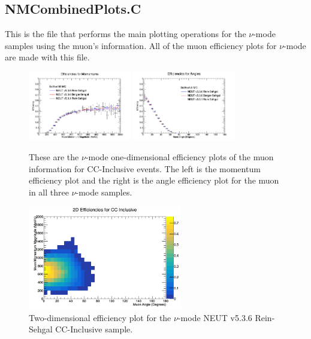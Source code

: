 \documentclass[11pt]{article}
\begin{document}
\subsection{NMCombinedPlots.C}
\label{sub:NMCombinedPlots.C}
This is the file that performs the main plotting operations for the $\nu$-mode samples using the muon's information. All of the muon efficiency plots for $\nu$-mode are made with this file.

\begin{figure}[H]
\centering
\includegraphics[width=0.4\textwidth]{NMCombinedPlotsImages/23-NMCombinedPlots.png}
\includegraphics[width=0.4\textwidth]{NMCombinedPlotsImages/22-NMCombinedPlots.png}
\caption{These are the $\nu$-mode one-dimensional efficiency plots of the muon information for CC-Inclusive events. The left is the momentum efficiency plot and the right is the angle efficiency plot for the muon in all three $\nu$-mode samples.}
\label{fig:app:NMCCInclusive1DEff}
\end{figure}

\begin{figure}[H]
\centering
\includegraphics[width=0.6\textwidth]{CCInclusivePlots/2DEffCompareNMRS.png}
\caption{Two-dimensional efficiency plot for the $\nu$-mode NEUT v5.3.6 Rein-Sehgal CC-Inclusive sample.}
\label{fig:app:NMCCInclusiveMuon2DEffRS}
\end{figure}
\end{document}
